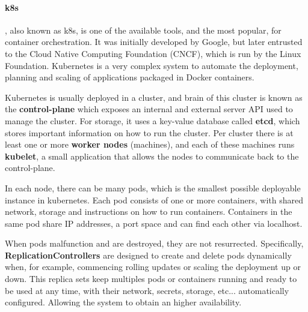 
\paragraph{\textbf{\acrlong{k8s}}}, also known as \acrshort{k8s}, is one of the available tools, and the most popular, for container orchestration. It was initially developed by Google, but later entrusted to the Cloud Native Computing Foundation (CNCF), which is run by the Linux Foundation. Kubernetes is a very complex system to automate the deployment, planning and scaling of applications packaged in Docker containers. 


Kubernetes is usually deployed in a cluster, and brain of this cluster is known as the \textbf{control-plane} which exposes an internal and external server API used to manage the cluster. For storage, it uses a key-value database called \textbf{etcd}, which stores important information on how to run the cluster. Per cluster there is at least one or more \textbf{worker nodes} (machines), and each of these machines runs \textbf{kubelet}, a small application that allows the nodes to communicate back to the control-plane. 

In each node, there can be many pods, which is the smallest possible deployable instance in kubernetes. Each pod consists of one or more containers, with shared network, storage and instructions on how to run containers. Containers in the same pod share IP addresses, a port space and can find each other via localhost.

When pods malfunction and are destroyed, they are not resurrected. Specifically, \textbf{ReplicationControllers} are designed to create and delete pods dynamically when, for example, commencing rolling updates or scaling the deployment up or down. This replica sets keep multiples pods or containers running and ready to be used at any time, with their network, secrets, storage, etc... automatically configured. Allowing the system to obtain an higher availability.

